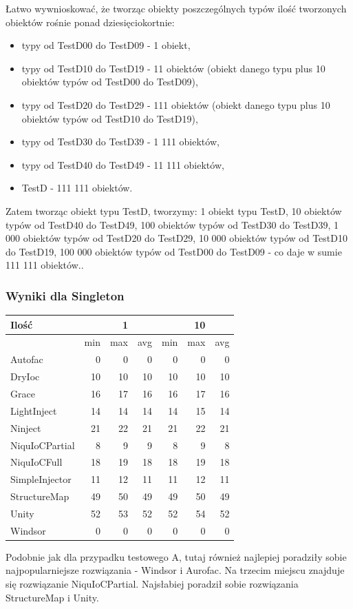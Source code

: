 \documentclass[12pt]{article}
\begin{document}
Łatwo wywnioskować, że tworząc obiekty poszczególnych typów ilość tworzonych obiektów rośnie ponad dziesięciokortnie:
\begin{itemize}
	\item typy od TestD00 do TestD09 - 1 obiekt,
	\item typy od TestD10 do TestD19 - 11 obiektów (obiekt danego typu plus 10 obiektów typów od TestD00 do TestD09),
	\item typy od TestD20 do TestD29 - 111 obiektów (obiekt danego typu plus 10 obiektów typów od TestD10 do TestD19),
	\item typy od TestD30 do TestD39 - 1 111 obiektów,
	\item  typy od TestD40 do TestD49 - 11 111 obiektów,
	\item TestD - 111 111 obiektów.
\end{itemize}
Zatem tworząc obiekt typu TestD, tworzymy: 1 obiekt typu TestD, 10 obiektów typów od TestD40 do TestD49, 100 obiektów typów od TestD30 do TestD39, 1 000 obiektów typów od TestD20 do TestD29, 10 000 obiektów typów od TestD10 do TestD19, 100 000 obiektów typów od TestD00 do TestD09 - co daje w sumie 111 111 obiektów..

\subsubsection{Wyniki dla Singleton}
\begin{center}
\begin{small}
	\begin{tabular}{ | l | r r r | r r r | }
    		\hline
Ilość & & 1 & & & 10 & \\ \hline
 & min & max & avg & min & max & avg \\ \hline
Autofac & 0 & 0 & 0 & 0 & 0 & 0 \\ \hline
DryIoc & 10 & 10 & 10 & 10 & 10 & 10 \\ \hline
Grace & 16 & 17 & 16 & 16 & 17 & 16 \\ \hline
LightInject & 14 & 14 & 14 & 14 & 15 & 14 \\ \hline
Ninject & 21 & 22 & 21 & 21 & 22 & 21 \\ \hline
NiquIoCPartial & 8 & 9 & 9 & 8 & 9 & 8 \\ \hline
NiquIoCFull & 18 & 19 & 18 & 18 & 19 & 18 \\ \hline
SimpleInjector & 11 & 12 & 11 & 11 & 12 & 11 \\ \hline
StructureMap & 49 & 50 & 49 & 49 & 50 & 49 \\ \hline
Unity & 52 & 53 & 52 & 52 & 54 & 52 \\ \hline
Windsor & 0 & 0 & 0 & 0 & 0 & 0 \\ \hline
  	\end{tabular}
\end{small}
\end{center}
Podobnie jak dla przypadku testowego A, tutaj również najlepiej poradziły sobie najpopularniejsze rozwiązania - Windsor i Aurofac. Na trzecim miejscu znajduje się rozwiązanie NiquIoCPartial. Najsłabiej poradził sobie rozwiązania StructureMap i Unity.
\end{document}
